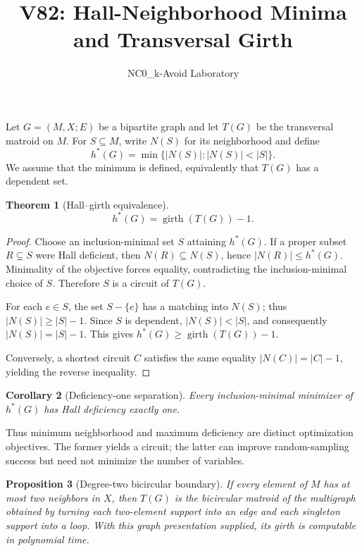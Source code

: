 \documentclass[11pt]{article}
\title{V82: Hall-Neighborhood Minima and Transversal Girth}
\author{NC0\_k-Avoid Laboratory}
\date{}
\newtheorem{theorem}{Theorem}
\newtheorem{corollary}[theorem]{Corollary}
\newtheorem{proposition}[theorem]{Proposition}
\begin{document}
\maketitle

Let \(G=(M,X;E)\) be a bipartite graph and let \(T(G)\) be the
transversal matroid on \(M\). For \(S\subseteq M\), write \(N(S)\) for
its neighborhood and define
\[
  h^*(G)=\min\{|N(S)|:|N(S)|<|S|\}.
\]
We assume that the minimum is defined, equivalently that \(T(G)\) has a
dependent set.

\begin{theorem}[Hall--girth equivalence]
\[
  h^*(G)=\operatorname{girth}(T(G))-1.
\]
\end{theorem}

\begin{proof}
Choose an inclusion-minimal set \(S\) attaining \(h^*(G)\). If a
proper subset \(R\subsetneq S\) were Hall deficient, then
\(N(R)\subseteq N(S)\), hence \(|N(R)|\le h^*(G)\). Minimality of the
objective forces equality, contradicting the inclusion-minimal choice
of \(S\). Therefore \(S\) is a circuit of \(T(G)\).

For each \(e\in S\), the set \(S-\{e\}\) has a matching into \(N(S)\);
thus \(|N(S)|\ge |S|-1\). Since \(S\) is dependent,
\(|N(S)|<|S|\), and consequently \(|N(S)|=|S|-1\). This gives
\(h^*(G)\ge \operatorname{girth}(T(G))-1\).

Conversely, a shortest circuit \(C\) satisfies the same equality
\(|N(C)|=|C|-1\), yielding the reverse inequality.
\end{proof}

\begin{corollary}[Deficiency-one separation]
Every inclusion-minimal minimizer of \(h^*(G)\) has Hall deficiency
exactly one.
\end{corollary}

Thus minimum neighborhood and maximum deficiency are distinct
optimization objectives. The former yields a circuit; the latter can
improve random-sampling success but need not minimize the number of
variables.

\begin{proposition}[Degree-two bicircular boundary]
If every element of \(M\) has at most two neighbors in \(X\), then
\(T(G)\) is the bicircular matroid of the multigraph obtained by turning
each two-element support into an edge and each singleton support into a
loop. With this graph presentation supplied, its girth is computable
in polynomial time.
\end{proposition}
\end{document}
